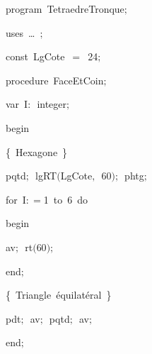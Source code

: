 
{
\parindent {}
\medskip

\carrenoir
\vspace{\neglskip}\mbox{\blc  \idt  \mcl program\idt \ TetraedreTronque$;$
}\par 
\vspace{\neglskip}\mbox{\blc \blk\idt \mcl uses\idt \ \ldots\ $;$
}\par 
\medskip

\pagebreak[3] 
\vspace{\neglskip}\mbox{\blc  \blk\idt  \mcl const\idt \ LgCote\ $=$\ 24$;$}\par 
\medskip

\pagebreak[3] 
\vspace{\neglskip}\mbox{\blc  \blk\idt  \mcl procedure\idt \ FaceEtCoin$;$}\par 
\pagebreak[3] 
\vspace{\neglskip}\mbox{\blc  \blk\blk\idt  \mcl var\idt \ I$:$\ integer$;$}\par 
\vspace{\neglskip}\mbox{\blc  \blk\idt  \mcl begin\idt }\par 
\vspace{\neglskip}\mbox{\blc  \blk\blk\idt  \cmt  \{\ Hexagone\ \}\idt }\par 
\vspace{\neglskip}\mbox{\blc  \blk\blk\idt  pqtd$;$\ lgRT$($LgCote$,$\ 60$)$$;$\ phtg$;$}\par 
\pagebreak[3] 
\vspace{\neglskip}\mbox{\blc  \blk\blk\idt  \mcl for\idt \ I$:$$=$1\ \mcl to\idt \ 6\ \mcl do\idt }\par 
\vspace{\neglskip}\mbox{\blc  \blk\blk\blk\idt  \mcl begin\idt }\par 
\vspace{\neglskip}\mbox{\blc  \blk\blk\blk\blk\idt  av$;$\ rt$($60$)$$;$}\par 
\vspace{\neglskip}\mbox{\blc  \blk\blk\blk\idt  \mcl end\idt $;$}\par 
\vspace{\neglskip}\mbox{\blc  \blk\blk\idt  \cmt  \{\ Triangle\ équilatéral\ \}\idt }\par 
\vspace{\neglskip}\mbox{\blc  \blk\blk\idt  pdt$;$\ av$;$\ pqtd$;$\ av$;$\ }\par 
\vspace{\neglskip}\mbox{\blc  \blk\idt  \mcl end\idt $;$}\par 
\medskip

}
